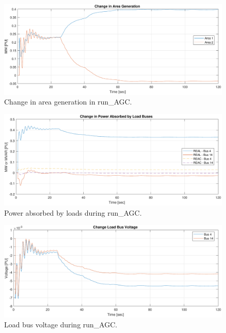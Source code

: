 \begin{figure}[H]
	\centering
	\footnotesize
	\includegraphics[width=\linewidth]{examples/agc/run-AGC-3}
	\caption{Change in area generation in run\_AGC.}
	\label{fig: runAGC area gen}
\end{figure}%


\begin{figure}[H]
	\centering
	\footnotesize
	\includegraphics[width=\linewidth]{examples/agc/run-AGC-4}
	\caption{Power absorbed by loads during run\_AGC.}
	\label{fig: runAGC power}
\end{figure}%

\begin{figure}[H]
	\centering
	\footnotesize
	\includegraphics[width=\linewidth]{examples/agc/run-AGC-5}
	\caption{Load bus voltage during run\_AGC.}
	\label{fig: runAGC bus v}
\end{figure}%

